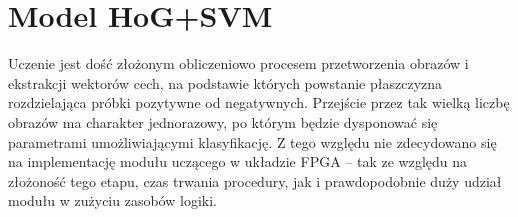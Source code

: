 \section{Model HoG+SVM}

 
 Uczenie jest dość złożonym obliczeniowo procesem przetworzenia obrazów i ekstrakcji wektorów cech, na podstawie których powstanie płaszczyzna rozdzielająca próbki pozytywne od negatywnych. %
 Przejście przez tak wielką liczbę obrazów ma charakter jednorazowy, po którym będzie dysponować się parametrami umożliwiającymi klasyfikację. 
 Z tego względu nie zdecydowano się na implementację modułu uczącego w układzie FPGA -- tak ze względu na złożoność tego etapu, czas trwania procedury, jak i prawdopodobnie duży udział modułu w zużyciu zasobów logiki. 
 
